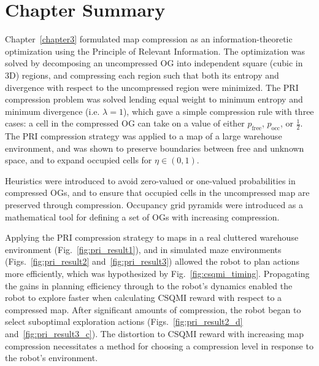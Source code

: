 \clearpage

\section{Chapter Summary}

Chapter~\ref{chapter3} formulated map compression as an information-theoretic
optimization using the Principle of Relevant Information. The optimization was
solved by decomposing an uncompressed OG into independent square (cubic in 3D) regions, and
compressing each region such that both its entropy and divergence with respect
to the uncompressed region were minimized. The PRI compression problem was solved lending equal
weight to minimum entropy and minimum divergence (i.e. $\lambda = 1$), which gave a simple
compression rule with three cases: a cell in the compressed OG can take on a
value of either $p_{\text{free}}$, $p_{\text{occ}}$, or $\frac{1}{2}$. The PRI compression strategy was applied to a
map of a large warehouse environment, and was shown to preserve boundaries
between free and unknown space, and to expand occupied cells for $\eta \in (0,
1)$.

Heuristics were introduced to avoid zero-valued or one-valued probabilities
in compressed OGs, and to ensure that occupied cells in
the uncompressed map are preserved through compression. Occupancy grid
pyramids were introduced as a mathematical tool for defining a set of OGs with
increasing compression.

Applying the PRI compression strategy to maps in a real cluttered warehouse
environment (Fig.~\ref{fig:pri_result1}), and in simulated maze environments
(Figs.~\ref{fig:pri_result2} and~\ref{fig:pri_result3}) allowed the robot to plan
actions more efficiently, which was hypothesized by Fig.~\ref{fig:csqmi_timing}.
Propagating the gains in planning efficiency through
to the robot's dynamics enabled the robot to explore faster when calculating
CSQMI reward with respect to a compressed map. After significant amounts of
compression, the robot began to select suboptimal exploration actions
(Figs.~\ref{fig:pri_result2_d} and~\ref{fig:pri_result3_c}). The distortion to
CSQMI reward with increasing map compression necessitates a
method for choosing a compression level in response to the robot's environment.

